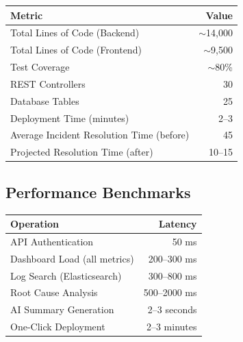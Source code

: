\documentclass[12pt,a4paper]{report}
\begin{document}
\begin{center}
\begin{tabular}{|l|r|}
  \hline
  \textbf{Metric} & \textbf{Value} \\
  \hline
  Total Lines of Code (Backend) & $\sim$14,000 \\
  Total Lines of Code (Frontend) & $\sim$9,500 \\
  Test Coverage & $\sim$80\% \\
  REST Controllers & 30 \\
  Database Tables & 25 \\
  Deployment Time (minutes) & 2--3 \\
  Average Incident Resolution Time (before) & 45 \\
  Projected Resolution Time (after) & 10--15 \\
  \hline
\end{tabular}
\end{center}

\subsection{Performance Benchmarks}

\begin{center}
\begin{tabular}{|l|r|}
  \hline
  \textbf{Operation} & \textbf{Latency} \\
  \hline
  API Authentication & 50 ms \\
  Dashboard Load (all metrics) & 200–300 ms \\
  Log Search (Elasticsearch) & 300–800 ms \\
  Root Cause Analysis & 500–2000 ms \\
  AI Summary Generation & 2–3 seconds \\
  One-Click Deployment & 2–3 minutes \\
  \hline
\end{tabular}
\end{center}
\end{document}
